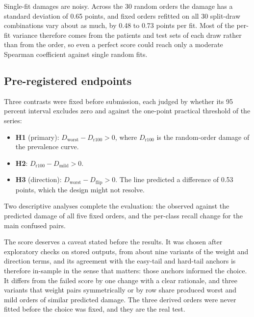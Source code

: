 \documentclass[11pt]{article}
\begin{document}
Single-fit damages are noisy. Across the 30 random orders the damage has a standard deviation of 0.65 points, and fixed orders refitted on all 30 split-draw combinations vary about as much, by 0.48 to 0.73 points per fit. Most of the per-fit variance therefore comes from the patients and test sets of each draw rather than from the order, so even a perfect score could reach only a moderate Spearman coefficient against single random fits.

\subsection{Pre-registered endpoints}
\label{sec:endpoints}
Three contrasts were fixed before submission, each judged by whether its 95 percent interval excludes zero and against the one-point practical threshold of the series:
\begin{itemize}
  \item \textbf{H1} (primary): $D_{\text{worst}} - D_{\text{r100}} > 0$, where $D_{\text{r100}}$ is the random-order damage of the prevalence curve.
  \item \textbf{H2}: $D_{\text{r100}} - D_{\text{mild}} > 0$.
  \item \textbf{H3} (direction): $D_{\text{worst}} - D_{\text{flip}} > 0$. The line predicted a difference of 0.53 points, which the design might not resolve.
\end{itemize}
\noindent Two descriptive analyses complete the evaluation: the observed against the predicted damage of all five fixed orders, and the per-class recall change for the main confused pairs.

The score deserves a caveat stated before the results. It was chosen after exploratory checks on stored outputs, from about nine variants of the weight and direction terms, and its agreement with the easy-tail and hard-tail anchors is therefore in-sample in the sense that matters: those anchors informed the choice. It differs from the failed score by one change with a clear rationale, and three variants that weight pairs symmetrically or by row share produced worst and mild orders of similar predicted damage. The three derived orders were never fitted before the choice was fixed, and they are the real test.





\end{document}
